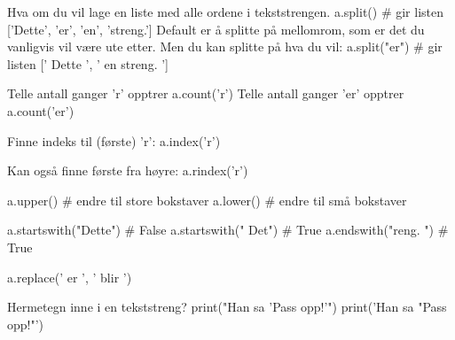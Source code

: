 Hva om du vil lage en liste med alle ordene i tekststrengen.
a.split()       # gir listen ['Dette', 'er', 'en', 'streng.']
Default er å splitte på mellomrom, som er det du vanligvis vil være ute etter. 
Men du kan splitte på hva du vil:
a.split("er")   # gir listen [' Dette ', ' en streng.  ']


Telle antall ganger 'r' opptrer
a.count('r')
Telle antall ganger 'er' opptrer
a.count('er')


Finne indeks til (første) 'r':
a.index('r')

Kan også finne første fra høyre:
a.rindex('r')

a.upper()  # endre til store bokstaver
a.lower()  # endre til små bokstaver

a.startswith("Dette")  # False
a.startswith(" Det")   # True
a.endswith("reng.  ")      # True

a.replace(' er ', ' blir ')


Hermetegn inne i en tekststreng? 
print("Han sa 'Pass opp!'")
print('Han sa "Pass opp!"')



\fi